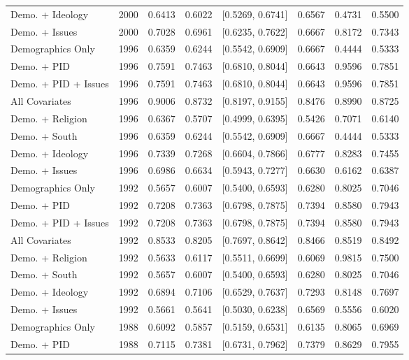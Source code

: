 \begin{longtable}{lrrrlrrr}
  Demo. + Ideology & 2000 & 0.6413 & 0.6022 & [0.5269, 0.6741] & 0.6567 & 0.4731 & 0.5500 \\ 
  Demo. + Issues & 2000 & 0.7028 & 0.6961 & [0.6235, 0.7622] & 0.6667 & 0.8172 & 0.7343 \\ 
  Demographics Only & 1996 & 0.6359 & 0.6244 & [0.5542, 0.6909] & 0.6667 & 0.4444 & 0.5333 \\ 
  Demo. + PID & 1996 & 0.7591 & 0.7463 & [0.6810, 0.8044] & 0.6643 & 0.9596 & 0.7851 \\ 
  Demo. + PID + Issues & 1996 & 0.7591 & 0.7463 & [0.6810, 0.8044] & 0.6643 & 0.9596 & 0.7851 \\ 
  All Covariates & 1996 & 0.9006 & 0.8732 & [0.8197, 0.9155] & 0.8476 & 0.8990 & 0.8725 \\ 
  Demo. + Religion & 1996 & 0.6367 & 0.5707 & [0.4999, 0.6395] & 0.5426 & 0.7071 & 0.6140 \\ 
  Demo. + South & 1996 & 0.6359 & 0.6244 & [0.5542, 0.6909] & 0.6667 & 0.4444 & 0.5333 \\ 
  Demo. + Ideology & 1996 & 0.7339 & 0.7268 & [0.6604, 0.7866] & 0.6777 & 0.8283 & 0.7455 \\ 
  Demo. + Issues & 1996 & 0.6986 & 0.6634 & [0.5943, 0.7277] & 0.6630 & 0.6162 & 0.6387 \\ 
  Demographics Only & 1992 & 0.5657 & 0.6007 & [0.5400, 0.6593] & 0.6280 & 0.8025 & 0.7046 \\ 
  Demo. + PID & 1992 & 0.7208 & 0.7363 & [0.6798, 0.7875] & 0.7394 & 0.8580 & 0.7943 \\ 
  Demo. + PID + Issues & 1992 & 0.7208 & 0.7363 & [0.6798, 0.7875] & 0.7394 & 0.8580 & 0.7943 \\ 
  All Covariates & 1992 & 0.8533 & 0.8205 & [0.7697, 0.8642] & 0.8466 & 0.8519 & 0.8492 \\ 
  Demo. + Religion & 1992 & 0.5633 & 0.6117 & [0.5511, 0.6699] & 0.6069 & 0.9815 & 0.7500 \\ 
  Demo. + South & 1992 & 0.5657 & 0.6007 & [0.5400, 0.6593] & 0.6280 & 0.8025 & 0.7046 \\ 
  Demo. + Ideology & 1992 & 0.6894 & 0.7106 & [0.6529, 0.7637] & 0.7293 & 0.8148 & 0.7697 \\ 
  Demo. + Issues & 1992 & 0.5661 & 0.5641 & [0.5030, 0.6238] & 0.6569 & 0.5556 & 0.6020 \\ 
  Demographics Only & 1988 & 0.6092 & 0.5857 & [0.5159, 0.6531] & 0.6135 & 0.8065 & 0.6969 \\ 
  Demo. + PID & 1988 & 0.7115 & 0.7381 & [0.6731, 0.7962] & 0.7379 & 0.8629 & 0.7955 \\ 

\end{longtable}

